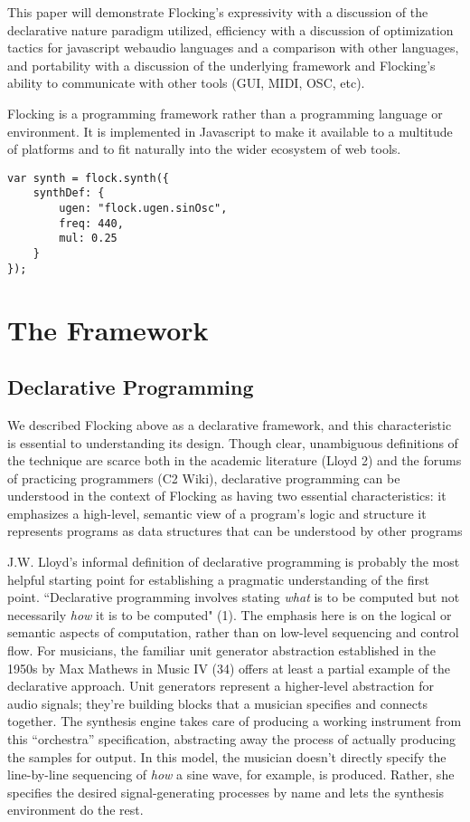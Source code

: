 \documentclass{article}
\begin{document}
This paper will demonstrate Flocking's expressivity with a discussion of the declarative nature paradigm utilized, efficiency with a discussion of optimization tactics for javascript webaudio languages and a comparison with other languages, and portability with a discussion of the underlying framework and Flocking's ability to communicate with other tools (GUI, MIDI, OSC, etc).

Flocking is a programming framework rather than a programming language or environment. It is implemented in Javascript to make it available to a multitude of platforms and to fit naturally into the wider ecosystem of web tools.


\begin{verbatim}
var synth = flock.synth({
    synthDef: {
        ugen: "flock.ugen.sinOsc",
        freq: 440,
        mul: 0.25
    }
});

\end{verbatim}


\section{The Framework}

\subsection{Declarative Programming}
We described Flocking above as a declarative framework, and this characteristic is essential to understanding its design. Though clear, unambiguous definitions of the technique are scarce both in the academic literature (Lloyd 2) and the forums of practicing programmers (C2 Wiki), declarative programming can be understood in the context of Flocking as having two essential characteristics:
it emphasizes a high-level, semantic view of a program’s logic and structure
it represents programs as data structures that can be understood by other programs

J.W. Lloyd's informal definition of declarative programming is probably the most helpful starting point for establishing a pragmatic understanding of the first point. ``Declarative programming involves stating {\it what} is to be computed but not necessarily {\it how} it is to be computed" (1). The emphasis here is on the logical or semantic aspects of computation, rather than on low-level sequencing and control flow. For musicians, the familiar unit generator abstraction established in the 1950s by Max Mathews in Music IV (34) offers at least a partial example of the declarative approach. Unit generators represent a higher-level abstraction for audio signals; they're building blocks that a musician specifies and connects together. The synthesis engine takes care of producing a working instrument from this “orchestra” specification, abstracting away the process of actually producing the samples for output. In this model, the musician doesn't directly specify the line-by-line sequencing of {\it how} a sine wave, for example, is produced. Rather, she specifies the desired signal-generating processes by name and lets the synthesis environment do the rest.
\end{document}
